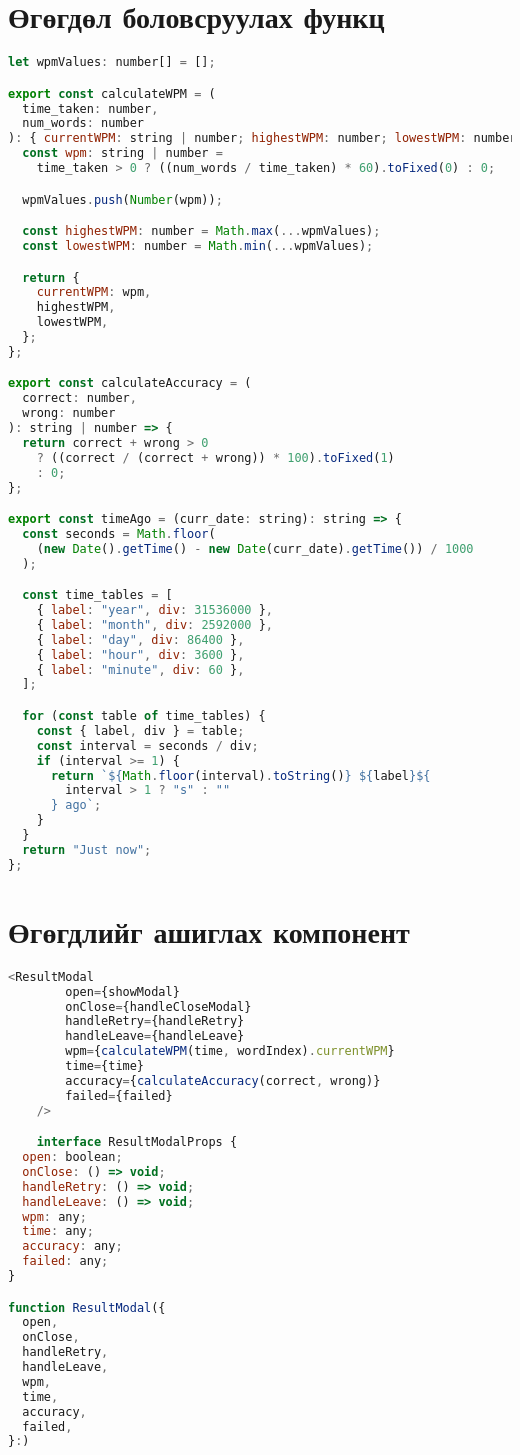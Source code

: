 \appendix
\renewcommand\bibname{Хавсралт}

\chapter{Өгөгдөл боловсруулах функц}
\label{appendix:data-calculation}

\begin{lstlisting}[language=Javascript, frame=single]
let wpmValues: number[] = [];

export const calculateWPM = (
  time_taken: number,
  num_words: number
): { currentWPM: string | number; highestWPM: number; lowestWPM: number } => {
  const wpm: string | number =
    time_taken > 0 ? ((num_words / time_taken) * 60).toFixed(0) : 0;

  wpmValues.push(Number(wpm));

  const highestWPM: number = Math.max(...wpmValues);
  const lowestWPM: number = Math.min(...wpmValues);

  return {
    currentWPM: wpm,
    highestWPM,
    lowestWPM,
  };
};

export const calculateAccuracy = (
  correct: number,
  wrong: number
): string | number => {
  return correct + wrong > 0
    ? ((correct / (correct + wrong)) * 100).toFixed(1)
    : 0;
};

export const timeAgo = (curr_date: string): string => {
  const seconds = Math.floor(
    (new Date().getTime() - new Date(curr_date).getTime()) / 1000
  );

  const time_tables = [
    { label: "year", div: 31536000 },
    { label: "month", div: 2592000 },
    { label: "day", div: 86400 },
    { label: "hour", div: 3600 },
    { label: "minute", div: 60 },
  ];

  for (const table of time_tables) {
    const { label, div } = table;
    const interval = seconds / div;
    if (interval >= 1) {
      return `${Math.floor(interval).toString()} ${label}${
        interval > 1 ? "s" : ""
      } ago`;
    }
  }
  return "Just now";
};

\end{lstlisting}

\chapter{Өгөгдлийг ашиглах компонент}
\label{appendix:data-usage}

\begin{lstlisting}[language=Javascript, frame=single]
	<ResultModal
		open={showModal}
		onClose={handleCloseModal}
		handleRetry={handleRetry}
		handleLeave={handleLeave}
		wpm={calculateWPM(time, wordIndex).currentWPM}
		time={time}
		accuracy={calculateAccuracy(correct, wrong)}
		failed={failed}
	/>

	interface ResultModalProps {
  open: boolean;
  onClose: () => void;
  handleRetry: () => void;
  handleLeave: () => void;
  wpm: any;
  time: any;
  accuracy: any;
  failed: any;
}

function ResultModal({
  open,
  onClose,
  handleRetry,
  handleLeave,
  wpm,
  time,
  accuracy,
  failed,
}:)
\end{lstlisting}


